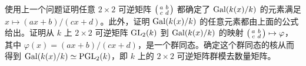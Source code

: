 \begin{problem}
  使用上一个问题证明任意 $2\times 2$ 可逆矩阵 
  $\begin{psmallmatrix}
    a & b \\ c & d
  \end{psmallmatrix}
  $ 都确定了 $\operatorname{Gal}(k(x)/k)$ 的元素满足 $x\mapsto (ax+b)/(cx+d)$。此外，证明
  $\operatorname{Gal}(k(x)/k)$ 的任意元素都由上面的公式给出。证明从 $k$ 上 $2\times 2$ 可逆矩阵
  $\operatorname{GL}_2(k)$ 到 $\operatorname{Gal}(k(x)/k)$ 的映射 
  $\begin{psmallmatrix}
    a & b \\ c & d
  \end{psmallmatrix}\mapsto\varphi$，
  其中 $\varphi(x)=(ax+b)/(cx+d)$，是一个群同态。确定这个群同态的核从而得到
  $\operatorname{Gal}(k(x)/k)\simeq \operatorname{PGL}_2(k)$，即 $k$ 上的 $2\times 2$ 可逆矩阵群模去数量矩阵。
\end{problem}




